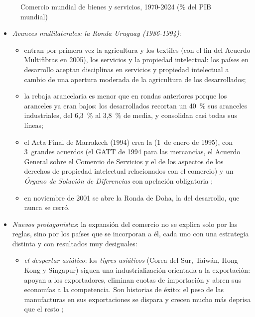 \documentclass[11pt]{article}
\begin{document}
\begin{figure}[H]
\centering
\caption{Comercio mundial de bienes y servicios, 1970-2024 (\% del PIB mundial)}\label{fig:apertura}
\end{figure}

\begin{itemize}
\item \emph{Avances multilaterales: la Ronda Uruguay (1986-1994)}:
  \begin{itemize}
  \item entran por primera vez la agricultura y los textiles (con el fin del Acuerdo Multifibras en 2005), los servicios y la propiedad intelectual: los países en desarrollo aceptan disciplinas en servicios y propiedad intelectual a cambio de una apertura moderada de la agricultura de los desarrollados;
  \item la rebaja arancelaria es menor que en rondas anteriores porque los aranceles ya eran bajos: los desarrollados recortan un 40~\% sus aranceles industriales, del 6,3~\% al 3,8~\% de media, y consolidan casi todas sus líneas\nocite{OMC2026Aranceles};
  \item el Acta Final de Marrakech (1994) crea la  (1~de enero de 1995), con 3~grandes acuerdos (el GATT de 1994 para las mercancías, el Acuerdo General sobre el Comercio de Servicios y el de los aspectos de los derechos de propiedad intelectual relacionados con el comercio) y un \emph{Órgano de Solución de Diferencias} con apelación obligatoria  ;
  \item en noviembre de 2001 se abre la Ronda de Doha, la del desarrollo, que nunca se cerró.
  \end{itemize}
\item \emph{Nuevos protagonistas}: la expansión del comercio no se explica solo por las reglas, sino por los países que se incorporan a él, cada uno con una estrategia distinta y con resultados muy desiguales:
  \begin{itemize}
  \item \emph{el despertar asiático}: los \emph{tigres asiáticos} (Corea del Sur, Taiwán, Hong Kong y Singapur) siguen una industrialización orientada a la exportación: apoyan a los exportadores, eliminan cuotas de importación y abren sus economías a la competencia. Son historias de éxito: el peso de las manufacturas en sus exportaciones se dispara y crecen mucho más deprisa que el resto ;

\end{itemize}
\end{itemize}
\end{document}
